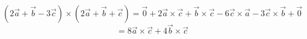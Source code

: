\documentclass{article}
\begin{document}
\[ (2\vec{a} + \vec{b} - 3\vec{c}) \times (2\vec{a} + \vec{b} + \vec{c}) = \vec{0} + 2\vec{a} \times \vec{c} + \vec{b} \times \vec{c} - 6\vec{c} \times \vec{a} - 3\vec{c} \times \vec{b} + \vec{0} \]
\[ = 8\vec{a} \times \vec{c} + 4\vec{b} \times \vec{c} \]
\end{document}
